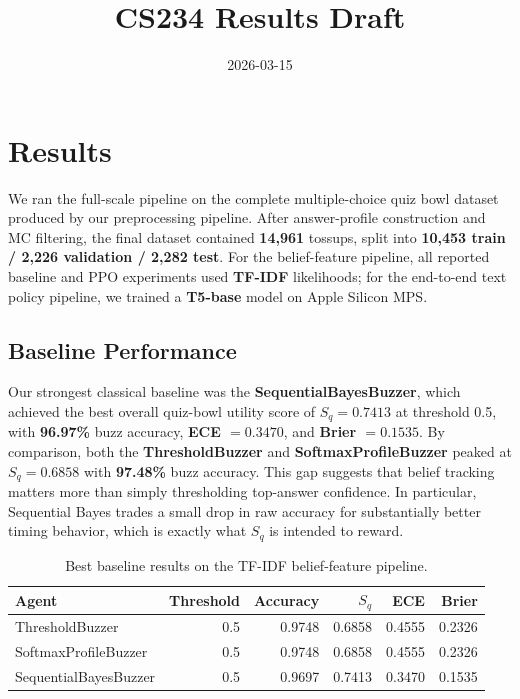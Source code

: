 \documentclass[11pt]{article}
\title{CS234 Results Draft}
\date{2026-03-15}
\begin{document}
\maketitle

\section{Results}

We ran the full-scale pipeline on the complete multiple-choice quiz bowl dataset
produced by our preprocessing pipeline. After answer-profile construction and
MC filtering, the final dataset contained \textbf{14,961} tossups, split into
\textbf{10,453 train / 2,226 validation / 2,282 test}. For the belief-feature
pipeline, all reported baseline and PPO experiments used \textbf{TF-IDF}
likelihoods; for the end-to-end text policy pipeline, we trained a
\textbf{T5-base} model on Apple Silicon MPS.

\subsection{Baseline Performance}

Our strongest classical baseline was the \textbf{SequentialBayesBuzzer}, which
achieved the best overall quiz-bowl utility score of
\textbf{$S_q = 0.7413$} at threshold 0.5, with \textbf{96.97\%} buzz accuracy,
\textbf{ECE $= 0.3470$}, and \textbf{Brier $= 0.1535$}. By comparison, both the
\textbf{ThresholdBuzzer} and \textbf{SoftmaxProfileBuzzer} peaked at
\textbf{$S_q = 0.6858$} with \textbf{97.48\%} buzz accuracy. This gap suggests
that belief tracking matters more than simply thresholding top-answer
confidence. In particular, Sequential Bayes trades a small drop in raw accuracy
for substantially better timing behavior, which is exactly what $S_q$ is
intended to reward.

\begin{table}[h]
\centering
\begin{tabular}{lrrrrr}
\toprule
Agent & Threshold & Accuracy & $S_q$ & ECE & Brier \\
\midrule
ThresholdBuzzer & 0.5 & 0.9748 & 0.6858 & 0.4555 & 0.2326 \\
SoftmaxProfileBuzzer & 0.5 & 0.9748 & 0.6858 & 0.4555 & 0.2326 \\
SequentialBayesBuzzer & 0.5 & 0.9697 & 0.7413 & 0.3470 & 0.1535 \\
\bottomrule
\end{tabular}
\caption{Best baseline results on the TF-IDF belief-feature pipeline.}
\end{table}
\end{document}
